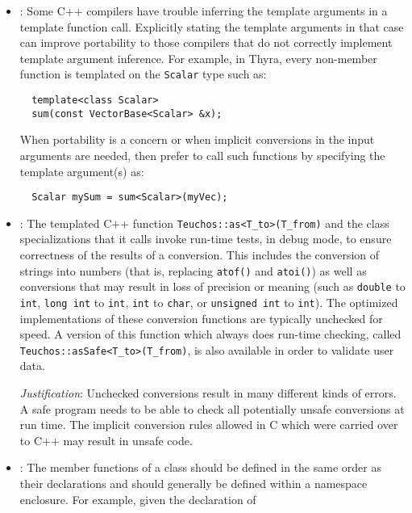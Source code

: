 \begin{itemize}

\item\GCGExplicitTemplateArguments: Some C++ compilers have trouble
  inferring the template arguments in a template function call.
  Explicitly stating the template arguments in that case can improve
  portability to those compilers that do not correctly implement
  template argument inference.  For example, in Thyra, every
  non-member function is templated on the \texttt{Scalar} type such
  as:

{\small\begin{verbatim}
  template<class Scalar>
  sum(const VectorBase<Scalar> &x);
\end{verbatim}}

When portability is a concern or when implicit conversions in the input
arguments are needed, then prefer to call such functions by specifying the
template argument(s) as:

{\small\begin{verbatim}
  Scalar mySum = sum<Scalar>(myVec);
\end{verbatim}}


\item\GCGTeuchosAs: The templated C++ function
  \texttt{Teuchos::as<T\_to>(T\_from)} and the class specializations
  that it calls invoke run-time tests, in debug mode, to ensure
  correctness of the results of a conversion.  This includes the
  conversion of strings into numbers (that is, replacing
  \texttt{atof()} and \texttt{atoi()}) as well as conversions that may
  result in loss of precision or meaning (such as \texttt{double} to
  \texttt{int}, \texttt{long int} to \texttt{int}, \texttt{int} to
  \texttt{char}, or \texttt{unsigned int} to \texttt{int}).  The
  optimized implementations of these conversion functions are
  typically unchecked for speed.  A version of this function which
  always does run-time checking, called
  \texttt{Teuchos\-::asSafe\-<\-T\_to\->\-(\-T\_from\-)}, is also
  available in order to validate user data.

  \textit{Justification}: Unchecked conversions result in many
  different kinds of errors.  A safe program needs to be able to check
  all potentially unsafe conversions at run time.  The implicit
  conversion rules allowed in C which were carried over to C++ may
  result in unsafe code.

\item\GCGNamespaceClassFuncDefs: The member functions of a class
  should be defined in the same order as their declarations and should
  generally be defined within a namespace enclosure.  For example,
  given the declaration of


\end{itemize}
